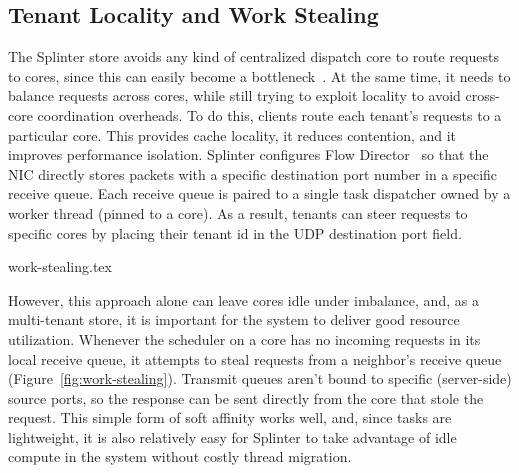 \subsection{Tenant Locality and Work Stealing}
\label{sec:work-stealing}

The Splinter store avoids any kind of centralized dispatch core to route
  requests to cores, since this can easily become a bottleneck~\cite{ramcloud}.
At the same time, it needs to balance requests across cores, while still trying
  to exploit locality to avoid cross-core coordination overheads.
To do this, clients route each tenant's requests to a particular core.
This provides cache locality, it reduces contention, and it improves performance
  isolation.
Splinter configures Flow Director~\cite{flow-director} so that
  the NIC directly stores packets with a specific destination port
  number in a specific
  receive queue.
Each receive queue is paired to a single task dispatcher owned by a
worker thread (pinned to a core).
As a result, tenants can steer requests to specific cores by placing their
  tenant id in the UDP destination port field.

 {work-stealing.tex}

However, this approach alone can leave cores idle under imbalance, and, as a multi-tenant
  store, it is important for the system to deliver good resource utilization.
Whenever the scheduler on a core has no
  incoming requests in its local receive queue, it attempts to steal requests
  from a neighbor's receive queue (Figure~\ref{fig:work-stealing}).
Transmit queues aren't bound to specific (server-side) source ports, so the
  response can be sent directly from the core that stole the request.
This simple form of soft affinity works well, and, since tasks are lightweight,
  it is also relatively easy for Splinter to take advantage of idle compute
  in the system without costly thread migration.
